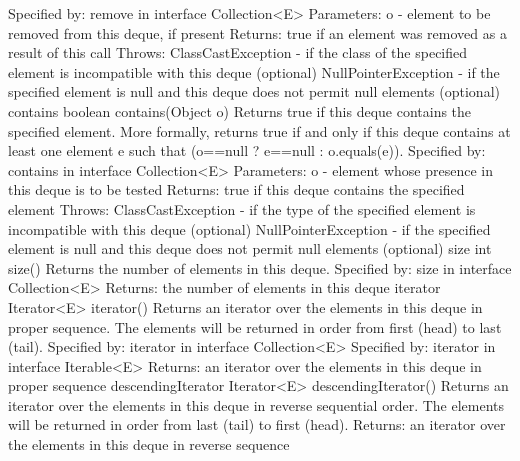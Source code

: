 \documentclass{book}
\begin{document}
Specified by:
remove in interface Collection<E>
Parameters:
o - element to be removed from this deque, if present
Returns:
true if an element was removed as a result of this call
Throws:
ClassCastException - if the class of the specified element is incompatible with this deque (optional)
NullPointerException - if the specified element is null and this deque does not permit null elements (optional)
contains
boolean contains(Object o)
Returns true if this deque contains the specified element. More formally, returns true if and only if this deque contains at least one element e such that (o==null ? e==null : o.equals(e)).
Specified by:
contains in interface Collection<E>
Parameters:
o - element whose presence in this deque is to be tested
Returns:
true if this deque contains the specified element
Throws:
ClassCastException - if the type of the specified element is incompatible with this deque (optional)
NullPointerException - if the specified element is null and this deque does not permit null elements (optional)
size
int size()
Returns the number of elements in this deque.
Specified by:
size in interface Collection<E>
Returns:
the number of elements in this deque
iterator
Iterator<E> iterator()
Returns an iterator over the elements in this deque in proper sequence. The elements will be returned in order from first (head) to last (tail).
Specified by:
iterator in interface Collection<E>
Specified by:
iterator in interface Iterable<E>
Returns:
an iterator over the elements in this deque in proper sequence
descendingIterator
Iterator<E> descendingIterator()
Returns an iterator over the elements in this deque in reverse sequential order. The elements will be returned in order from last (tail) to first (head).
Returns:
an iterator over the elements in this deque in reverse sequence
\end{document}
